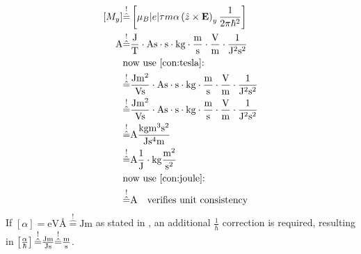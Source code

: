 \documentclass[
	fontsize = 11pt,
	paper = a4,
	draft = false,
	twoside = true,
	titlepage = false
]{scrartcl}
\numberwithin{equation}{subsection}
\begin{document}
	\begin{align} \label{pma:unitHand}
		\left[M_y\right] &\overset{!}{\hat{=}} \left[\mu_B |e| \tau m \alpha \left(\hat{z} \times \mathbf{E}\right)_y\frac{1}{2 \pi \hbar^2}\right] \notag\\
		\si{\ampere} &\overset{!}{\hat{=}} \si{\frac{\joule}{\tesla} \cdot \ampere \second \cdot \second \cdot \kilogram \cdot \frac{\meter}{\second} \cdot \frac{\volt}{\meter} \cdot \frac{1}{\joule^2 \second^2}} \notag\\
		& \text{now use \autoref{con:tesla}:} \notag\\
		&\overset{!}{\hat{=}} \si{\frac{\joule \meter^2}{\volt \second} \cdot \ampere \second \cdot \second \cdot \kilogram \cdot \frac{\meter}{\second} \cdot \frac{\volt}{\meter} \cdot \frac{1}{\joule^2 \second^2}} \notag\\
		&\overset{!}{\hat{=}} \si{\frac{\joule \meter^2}{\volt \second} \cdot \ampere \second \cdot \second \cdot \kilogram \cdot \frac{\meter}{\second} \cdot \frac{\volt}{\meter} \cdot \frac{1}{\joule^2 \second^2}} \notag\\
		&\overset{!}{\hat{=}} \si{\ampere \frac{\kilogram \meter^3 \second^2}{\joule \second^4 \meter}} \notag\\
		&\overset{!}{\hat{=}} \si{\ampere \frac{1}{\joule} \cdot \kilogram \frac{\meter^2}{\second^2}} \notag\\
		& \text{now use \autoref{con:joule}:} \notag\\
		&\overset{!}{\hat{=}} \si{\ampere} \ \ \text{ verifies unit consistency}
	\end{align}
	If $\left[\alpha\right] = \mathrm{eV}\si{\angstrom} \overset{!}{\hat{=}} \si{\joule \meter}$ as stated in  \autocite{paper1_Gaiardoni_2025}, an additional $\frac{1}{\hbar}$ correction is required, resulting in $\left[\frac{\alpha}{\hbar}\right] \overset{!}{\hat{=}} \si{\frac{\joule \meter}{\joule \second}} \overset{!}{\hat{=}} \si{\frac{\meter}{\second}}$.
\end{document}
